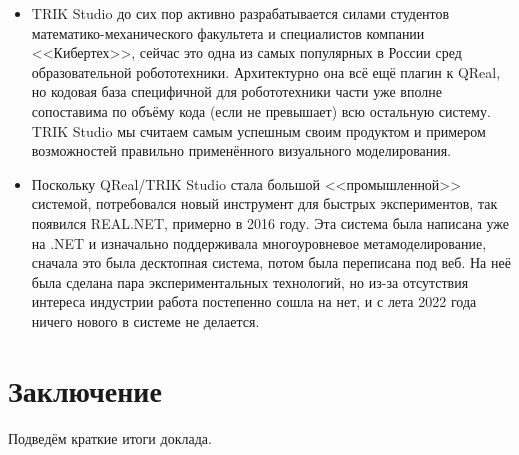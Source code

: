 \documentclass{text-style}
\begin{document}
\begin{itemize}
    \item TRIK Studio до сих пор активно разрабатывается силами студентов математико-механического факультета и специалистов компании <<Кибертех>>, сейчас это одна из самых популярных в России сред образовательной робототехники. Архитектурно она всё ещё плагин к QReal, но кодовая база специфичной для робототехники части уже вполне сопоставима по объёму кода (если не превышает) всю остальную систему. TRIK Studio мы считаем самым успешным своим продуктом и примером возможностей правильно применённого визуального моделирования.
    \item Поскольку QReal/TRIK Studio стала большой <<промышленной>> системой, потребовался новый инструмент для быстрых экспериментов, так появился REAL.NET, примерно в 2016 году. Эта система была написана уже на .NET и изначально поддерживала многоуровневое метамоделирование, сначала это была десктопная система, потом была переписана под веб. На неё была сделана пара экспериментальных технологий, но из-за отсутствия интереса индустрии работа постепенно сошла на нет, и с лета 2022 года ничего нового в системе не делается.
\end{itemize}


\section{Заключение}

Подведём краткие итоги доклада.
\end{document}
